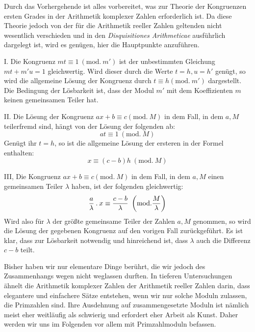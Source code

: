 Durch das Vorhergehende ist alles vorbereitet, was zur Theorie der Kongruenzen ersten Grades in der Arithmetik komplexer Zahlen erforderlich ist. Da diese Theorie jedoch
%
von der für die Arithmetik reeller Zahlen geltenden nicht wesentlich verschieden und in den \emph{Disquisitiones Arithmeticae} ausführlich dargelegt ist, wird es genügen, hier die Hauptpunkte anzuführen.

I. Die Kongruenz $mt\equiv1\ (\mathrm{mod.}\ m')$ ist der unbestimmten Gleichung $mt+m'u=1$ gleichwertig. Wird dieser durch die Werte $t=h,u=h'$ genügt, so wird die allgemeine Lösung der Kongruenz durch $t\equiv h(\mathrm{mod.}\ m')$ dargestellt. Die Bedingung der Lösbarkeit ist, dass der Modul $m'$ mit dem Koeffizienten $m$ keinen gemeinsamen Teiler hat.

II. Die Lösung der Kongruenz $ax+b\equiv c(\mathrm{mod.}\ M)$ in dem Fall, in dem $a,M$ teilerfremd sind, hängt von der Lösung der folgenden ab:
\[
at\equiv1\ (\mathrm{mod.}\ M)
\]
Genügt ihr $t=h$, so ist die allgemeine Lösung der ersteren in der Formel enthalten:
\[
x\equiv(c-b)h\ (\mathrm{mod.}\ M)
\]

III, Die Kongruenz $ax+b\equiv c(\mathrm{mod.}\ M)$ in dem Fall, in dem $a,M$ einen gemeinsamen Teiler $\lambda$ haben, ist der folgenden gleichwertig:
\[
\frac a\lambda\pdot x\equiv\frac{c-b}\lambda\ \left(\mathrm{mod.}\frac M\lambda\right)
\]
Wird also für $\lambda$ der größte gemeinsame Teiler der Zahlen $a,M$ genommen, so wird die Lösung der gegebenen Kongruenz auf den vorigen Fall zurückgeführt. Es ist klar, dass zur Lösbarkeit notwendig und hinreichend ist, dass $\lambda$ auch die Differenz $c-b$ teilt.

Bisher haben wir nur elementare Dinge berührt, die wir jedoch des Zusammenhangs wegen nicht weglassen durften. In tieferen Untersuchungen ähnelt die Arithmetik komplexer Zahlen der Arithmetik reeller Zahlen darin, dass elegantere und einfachere Sätze entstehen, wenn wir nur solche Moduln zulassen, die Primzahlen sind. Ihre Ausdehnung auf zusammengesetzte Moduln ist nämlich meist eher weitläufig als schwierig und erfordert eher Arbeit als Kunst. Daher werden wir uns im Folgenden vor allem mit Primzahlmoduln befassen.

